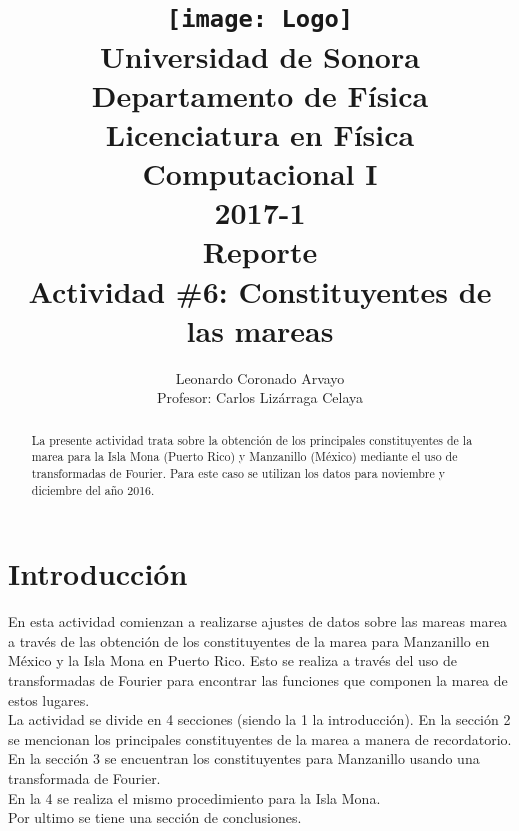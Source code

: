 \documentclass[12pt,letterpaper]{article}
\author{
Leonardo Coronado Arvayo\\
Profesor: Carlos Lizárraga Celaya   \vspace*{1.25in}}
\title{	\texttt{[image: Logo]} \\
Universidad de Sonora \\
{\small Departamento de Física \\
Licenciatura en Física \\
Computacional I \\
2017-1 \\
\vspace{0.55in} Reporte}\\ 
{\Huge Actividad \#6: Constituyentes de las mareas}\\
\vspace*{1.0in}}
\begin{document}
	\maketitle
\newpage
	\tableofcontents
\pagebreak

\begin{abstract}


La presente actividad trata sobre la obtención de los principales constituyentes de la marea para la Isla Mona (Puerto Rico) y Manzanillo (México) mediante el uso de transformadas de Fourier. Para este caso se utilizan los datos para noviembre y diciembre del año 2016.


\end{abstract}


\section{Introducción}

En esta actividad comienzan a realizarse ajustes de datos sobre las mareas marea a través de las obtención de los constituyentes de la marea para Manzanillo en México y la Isla Mona en Puerto Rico. 
Esto se realiza a través del uso de transformadas de Fourier para encontrar las funciones que componen la marea de estos lugares.\\


La actividad se divide en 4 secciones (siendo la 1 la introducción). En la sección 2 se mencionan los principales constituyentes de la marea a manera de recordatorio.\\
En la sección 3 se encuentran los constituyentes para Manzanillo usando una transformada de Fourier. \\
En la 4 se realiza el mismo procedimiento para la Isla Mona.\\
Por ultimo se tiene una sección de conclusiones.\\
\end{document}

